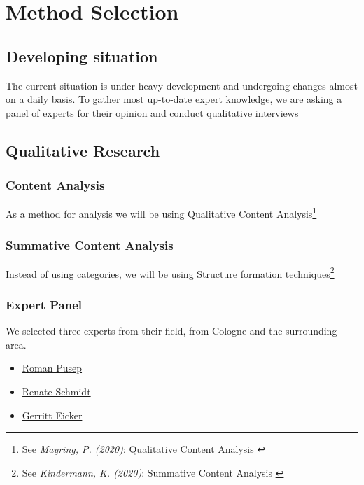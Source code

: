 %
%

\pagebreak
\section{Method Selection}

\onehalfspacing

\subsection{Developing situation}

The current situation is under heavy development and undergoing changes almost on a daily basis. To gather most up-to-date expert knowledge, we are asking a panel of experts for their opinion and conduct qualitative interviews

\subsection{Qualitative Research}

\subsubsection{Content Analysis}

As a method for analysis we will be using Qualitative Content Analysis\footnote{See \textit{Mayring, P. (2020)}: Qualitative Content Analysis \cite{qualiContent}}

\subsubsection{Summative Content Analysis} 

Instead of using categories, we will be using Structure formation techniques\footnote{See \textit{Kindermann, K. (2020)}: Summative Content Analysis \cite{summaContent}}

\subsubsection{Expert Panel}

We selected three experts from their field, from Cologne and the surrounding area.

\begin{itemize}
 \item \href{https://www.linkedin.com/in/roman-pusep-36b33374/}{Roman Pusep}
 \item \href{https://www.linkedin.com/in/renate-schmid-535233113/}{Renate Schmidt}
 \item \href{https://www.linkedin.com/in/eicker/}{Gerritt Eicker}
\end{itemize}

